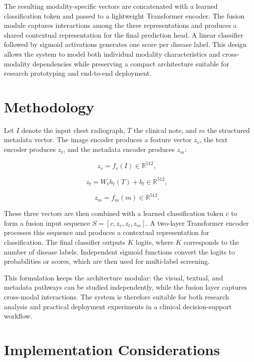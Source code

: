 \documentclass[conference,a4paper]{IEEEtran}
\begin{document}
The resulting modality-specific vectors are concatenated with a learned classification token and passed to a lightweight Transformer encoder. The fusion module captures interactions among the three representations and produces a shared contextual representation for the final prediction head. A linear classifier followed by sigmoid activations generates one score per disease label. This design allows the system to model both individual modality characteristics and cross-modality dependencies while preserving a compact architecture suitable for research prototyping and end-to-end deployment.

\section{Methodology}

Let $I$ denote the input chest radiograph, $T$ the clinical note, and $m$ the structured metadata vector. The image encoder produces a feature vector $z_v$, the text encoder produces $z_t$, and the metadata encoder produces $z_m$:

\begin{equation}
z_v = f_v(I) \in \mathbb{R}^{512},
\end{equation}

\begin{equation}
z_t = W_t h_t(T) + b_t \in \mathbb{R}^{512},
\end{equation}

\begin{equation}
z_m = f_m(m) \in \mathbb{R}^{512}.
\end{equation}

These three vectors are then combined with a learned classification token $c$ to form a fusion input sequence $S = [c, z_v, z_t, z_m]$. A two-layer Transformer encoder processes this sequence and produces a contextual representation for classification. The final classifier outputs $K$ logits, where $K$ corresponds to the number of disease labels. Independent sigmoid functions convert the logits to probabilities or scores, which are then used for multi-label screening.

This formulation keeps the architecture modular: the visual, textual, and metadata pathways can be studied independently, while the fusion layer captures cross-modal interactions. The system is therefore suitable for both research analysis and practical deployment experiments in a clinical decision-support workflow.

\section{Implementation Considerations}
\end{document}
